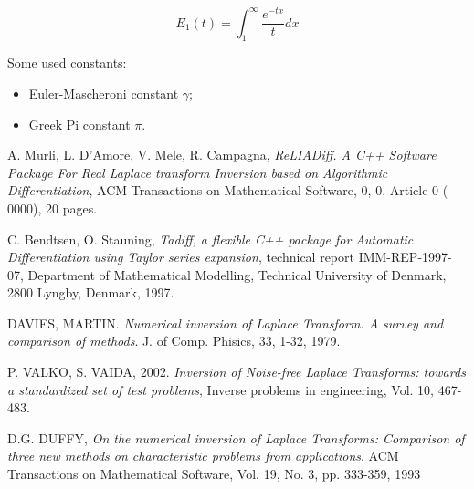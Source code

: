 \documentclass[10pt]{article}
\begin{document}
$$ E_1(t) = \int_1^{\infty}\frac{e^{-tx}}{t}dx$$


Some used constants:

\begin{itemize}
  \item Euler-Mascheroni constant $\gamma$;
  \item Greek Pi constant $\pi$.
\end{itemize}

\newpage

\begin{thebibliography}{10}
  	 A. Murli, L. D'Amore, V. Mele, R. Campagna, \emph{ReLIADiff. A C++ Software Package For Real Laplace
transform Inversion based on Algorithmic Differentiation}, ACM Transactions on Mathematical Software,
0, 0, Article 0 ( 0000), 20 pages.

 	C. Bendtsen, O. Stauning, \emph{ Tadiff, a flexible C++ package for Automatic Differentiation using Taylor series expansion}, technical report IMM-REP-1997-07, Department of Mathematical Modelling, Technical University of Denmark, 2800 Lyngby, Denmark, 1997.

	DAVIES, MARTIN. \emph{ Numerical inversion of Laplace Transform. A survey and comparison of methods}.
J. of Comp. Phisics, 33, 1-32, 1979.

	P. VALKO, S. VAIDA, 2002. \emph{ Inversion of Noise-free Laplace Transforms: towards a standardized set of test
problems}, Inverse problems in engineering, Vol. 10, 467-483.

	D.G. DUFFY, \emph{ On the numerical inversion of Laplace Transforms: Comparison of three new methods
on characteristic problems from applications}. ACM Transactions on Mathematical Software, Vol. 19, No.
3, pp. 333-359, 1993

\end{thebibliography}
\end{document}
